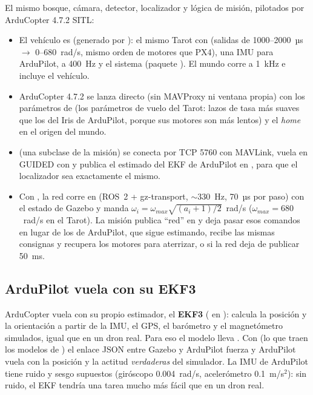 El mismo bosque, cámara, detector, localizador y lógica de misión, pilotados por ArduCopter 4.7.2 SITL:
\begin{itemize}
  \item El vehículo es  (generado por ):
        el mismo Tarot con  (salidas de 1000--2000~µs $\rightarrow$ 0--680~rad/s, mismo
        orden de motores que PX4), una IMU para ArduPilot,  a 400~Hz y el sistema
         (paquete ). El mundo corre a 1~kHz e incluye el
        vehículo.
  \item ArduCopter 4.7.2 se lanza directo (sin MAVProxy ni ventana propia) con los parámetros de
         (los parámetros de vuelo del Tarot: lazos de tasa más
        suaves que los del Iris de ArduPilot, porque sus motores son más lentos) y el \emph{home} en el
        origen del mundo.
  \item {} (una subclase de la misión) se conecta por TCP 5760 con MAVLink, vuela en
        GUIDED con  y publica el estimado del EKF de ArduPilot en
        , para que el localizador sea exactamente el mismo.
  \item Con , la red corre en  (ROS~2 + gz-transport,
        $\sim$330~Hz, 70~µs por paso) con el estado de Gazebo y manda
        $\omega_i = \omega_{max}\sqrt{(a_i+1)/2}$~rad/s ($\omega_{max} = 680$~rad/s en el Tarot). La misión
        publica ``red'' en  y  deja pasar esos comandos en
        lugar de los de ArduPilot, que sigue estimando, recibe las mismas consignas y recupera los motores
        para aterrizar, o si la red deja de publicar 50~ms.
\end{itemize}

\subsection{ArduPilot vuela con su EKF3}

ArduCopter vuela con su propio estimador, el \textbf{EKF3} ( en
): calcula la posición y la orientación a partir de la IMU, el GPS, el barómetro y
el magnetómetro simulados, igual que en un dron real. Para eso el modelo lleva .
Con  (lo que traen los modelos de ) el enlace JSON entre
Gazebo y ArduPilot fuerza  y ArduPilot vuela con la posición y la actitud
\emph{verdaderas} del simulador. La IMU de ArduPilot tiene ruido y sesgo supuestos (giróscopo
0.004~rad/s, acelerómetro 0.1~m/s$^2$): sin ruido, el EKF tendría una tarea mucho más fácil que en un
dron real.


